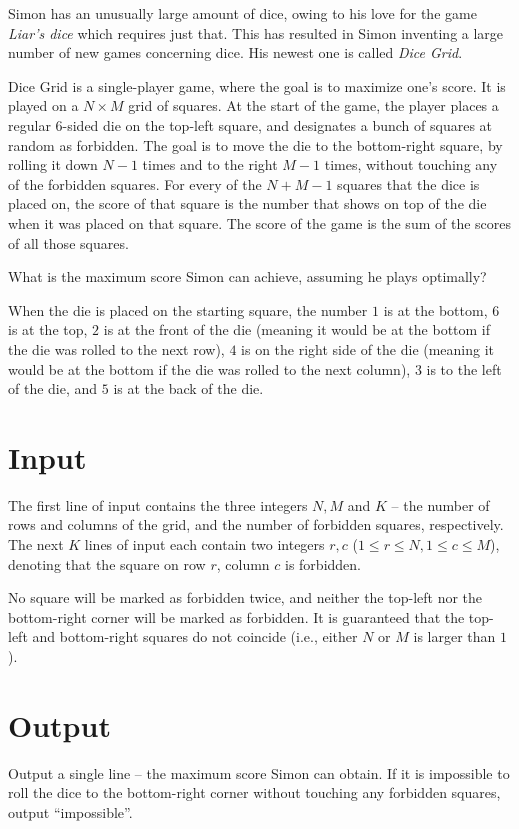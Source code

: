 Simon has an unusually large amount of dice, owing to his love for the game \emph{Liar's dice} which requires just that.
This has resulted in Simon inventing a large number of new games concerning dice.
His newest one is called \emph{Dice Grid}.

Dice Grid is a single-player game, where the goal is to maximize one's score.
It is played on a $N \times M$ grid of squares.
At the start of the game, the player places a regular 6-sided die on the top-left square,
and designates a bunch of squares at random as forbidden.
The goal is to move the die to the bottom-right square, by rolling it down $N-1$ times and to the right $M-1$ times, without touching any of the forbidden squares.
For every of the $N + M - 1$ squares that the dice is placed on, the score of that square is the number that shows on top of the die when it was placed on that square.
The score of the game is the sum of the scores of all those squares.

What is the maximum score Simon can achieve, assuming he plays optimally?

When the die is placed on the starting square, the number $1$ is at the bottom, $6$ is at the top, $2$ is at the front of the die (meaning it would be at the bottom if the die was rolled to the next row), $4$ is on the right side of the die (meaning it would be at the bottom if the die was rolled to the next column), $3$ is to the left of the die, and $5$ is at the back of the die.

\section*{Input}
The first line of input contains the three integers $N, M$ and $K$ -- the number of rows and columns of the grid, and the number of forbidden squares, respectively.
The next $K$ lines of input each contain two integers $r, c$ ($1 \le r \le N, 1 \le c \le M$), denoting that the square on row $r$, column $c$ is forbidden.

No square will be marked as forbidden twice, and neither the top-left nor the bottom-right corner will be marked as forbidden.
It is guaranteed that the top-left and bottom-right squares do not coincide (i.e., either $N$ or $M$ is larger than $1$).

\section*{Output}
Output a single line -- the maximum score Simon can obtain.
If it is impossible to roll the dice to the bottom-right corner without touching any forbidden squares, output ``impossible''.

